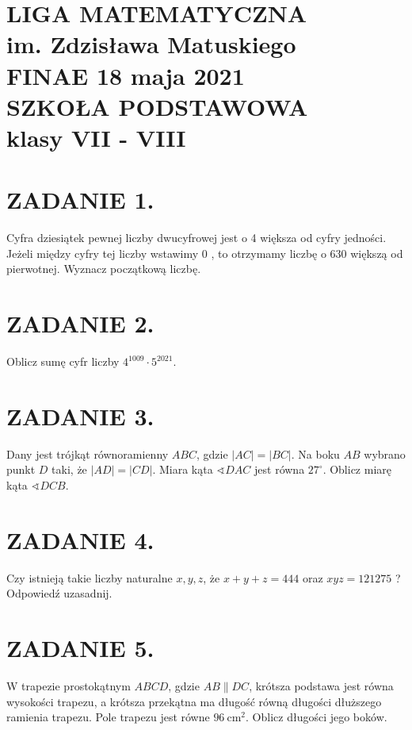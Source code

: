 \documentclass[10pt]{article}
\newcommand\varangle{\mathop{\sphericalangle}}
\begin{document}
\section*{LIGA MATEMATYCZNA \\
 im. Zdzisława Matuskiego \\
 FINAE 18 maja 2021 \\
 SZKOŁA PODSTAWOWA \\
 klasy VII - VIII}
\section*{ZADANIE 1.}
Cyfra dziesiątek pewnej liczby dwucyfrowej jest o 4 większa od cyfry jedności. Jeżeli między cyfry tej liczby wstawimy 0 , to otrzymamy liczbę o 630 większą od pierwotnej. Wyznacz początkową liczbę.

\section*{ZADANIE 2.}
Oblicz sumę cyfr liczby \(4^{1009} \cdot 5^{2021}\).

\section*{ZADANIE 3.}
Dany jest trójkąt równoramienny \(A B C\), gdzie \(|A C|=|B C|\). Na boku \(A B\) wybrano punkt \(D\) taki, że \(|A D|=|C D|\). Miara kąta \(\varangle D A C\) jest równa \(27^{\circ}\). Oblicz miarę kąta \(\varangle D C B\).

\section*{ZADANIE 4.}
Czy istnieją takie liczby naturalne \(x, y, z\), że \(x+y+z=444\) oraz \(x y z=121275\) ? Odpowiedź uzasadnij.

\section*{ZADANIE 5.}
W trapezie prostokątnym \(A B C D\), gdzie \(A B \| D C\), krótsza podstawa jest równa wysokości trapezu, a krótsza przekątna ma długość równą długości dłuższego ramienia trapezu. Pole trapezu jest równe \(96 \mathrm{~cm}^{2}\). Oblicz długości jego boków.
\end{document}
